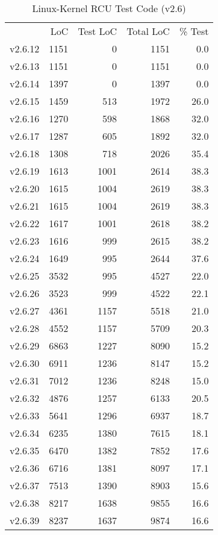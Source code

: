 \begin{table}[tbhp]
\renewcommand*{\arraystretch}{1.2}\centering\small
\begin{tabular}{lrrrr}\toprule
	& LoC & Test LoC & Total LoC & \% Test \\
v2.6.12 & 1151 & 0 & 1151 & 0.0 \\
v2.6.13 & 1151 & 0 & 1151 & 0.0 \\
v2.6.14 & 1397 & 0 & 1397 & 0.0 \\
v2.6.15 & 1459 & 513 & 1972 & 26.0 \\
v2.6.16 & 1270 & 598 & 1868 & 32.0 \\
v2.6.17 & 1287 & 605 & 1892 & 32.0 \\
v2.6.18 & 1308 & 718 & 2026 & 35.4 \\
v2.6.19 & 1613 & 1001 & 2614 & 38.3 \\
v2.6.20 & 1615 & 1004 & 2619 & 38.3 \\
v2.6.21 & 1615 & 1004 & 2619 & 38.3 \\
v2.6.22 & 1617 & 1001 & 2618 & 38.2 \\
v2.6.23 & 1616 & 999 & 2615 & 38.2 \\
v2.6.24 & 1649 & 995 & 2644 & 37.6 \\
v2.6.25 & 3532 & 995 & 4527 & 22.0 \\
v2.6.26 & 3523 & 999 & 4522 & 22.1 \\
v2.6.27 & 4361 & 1157 & 5518 & 21.0 \\
v2.6.28 & 4552 & 1157 & 5709 & 20.3 \\
v2.6.29 & 6863 & 1227 & 8090 & 15.2 \\
v2.6.30 & 6911 & 1236 & 8147 & 15.2 \\
v2.6.31 & 7012 & 1236 & 8248 & 15.0 \\
v2.6.32 & 4876 & 1257 & 6133 & 20.5 \\
v2.6.33 & 5641 & 1296 & 6937 & 18.7 \\
v2.6.34 & 6235 & 1380 & 7615 & 18.1 \\
v2.6.35 & 6470 & 1382 & 7852 & 17.6 \\
v2.6.36 & 6716 & 1381 & 8097 & 17.1 \\
v2.6.37 & 7513 & 1390 & 8903 & 15.6 \\
v2.6.38 & 8217 & 1638 & 9855 & 16.6 \\
v2.6.39 & 8237 & 1637 & 9874 & 16.6 \\
\bottomrule
\end{tabular}
\caption{Linux-Kernel RCU Test Code (v2.6)}
\label{tab:formal:Linux-Kernel RCU Test Code (v2.6)}
\end{table}

